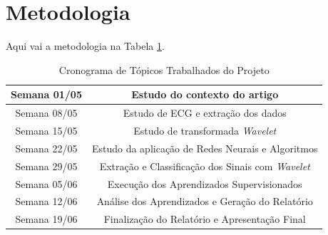 \documentclass[conference]{IEEEtran}
\begin{document}


\section{Metodologia}

Aqui vai a metodologia na Tabela \ref{table:cronogramaProjeto}.

%

\renewcommand\tablename{TABELA}
\begin{table}[!h]
\renewcommand{\arraystretch}{1.3}
\caption{Cronograma de Tópicos Trabalhados do Projeto}
\label{table:cronogramaProjeto}
\centering
\begin{tabular}{|c|c|}
\hline
Semana 01/05 & Estudo do contexto do artigo\\
\hline
Semana 08/05 & Estudo de ECG e extração dos dados\\
\hline
Semana 15/05 & Estudo de transformada \textit{Wavelet}\\
\hline
Semana 22/05 & Estudo da aplicação de Redes Neurais e Algoritmos\\
\hline
Semana 29/05 & Extração e Classificação dos Sinais com \textit{Wavelet}\\
\hline
Semana 05/06 & Execução dos Aprendizados Supervisionados\\
\hline
Semana 12/06 & Análise dos Aprendizados e Geração do Relatório\\
\hline
Semana 19/06 & Finalização do Relatório e Apresentação Final\\
\hline
\end{tabular}
\end{table}
\end{document}

